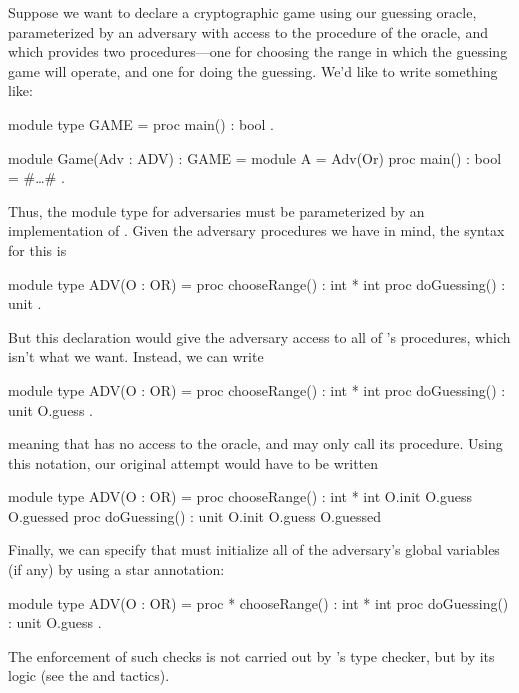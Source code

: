 Suppose we want to declare a cryptographic game using our guessing
oracle, parameterized by an adversary with access to the 
procedure of the oracle, and which provides two procedures---one
for choosing the range in which the guessing game will operate, and
one for doing the guessing.  We'd like to write something like:
\begin{easycrypt}{}{}
module type GAME = {
  proc main() : bool
}.

module Game(Adv : ADV) : GAME = {
  module A = Adv(Or)
  proc main() : bool = { #\ldots# }
}.
\end{easycrypt}
Thus, the module type  for adversaries must be parameterized
by an implementation of . Given the adversary procedures we have
in mind, the syntax for this is
\begin{easycrypt}{}{}
module type ADV(O : OR) = {
  proc chooseRange() : int * int
  proc doGuessing() : unit
}.
\end{easycrypt}
But this declaration would give the adversary access to all of 's
procedures, which isn't what we want. Instead, we can write
\begin{easycrypt}{}{}
module type ADV(O : OR) = {
  proc chooseRange() : int * int {}
  proc doGuessing() : unit {O.guess}
}.
\end{easycrypt}
meaning that  has no access to the oracle, and
 may only call its  procedure. Using
this notation, our original attempt would have to be written
\begin{easycrypt}{}{}
module type ADV(O : OR) = {
  proc chooseRange() : int * int {O.init O.guess O.guessed}
  proc doGuessing() : unit {O.init O.guess O.guessed}
}
\end{easycrypt}

Finally, we can specify that  must initialize
all of the adversary's global variables (if any) by using a
star annotation:
\begin{easycrypt}{}{}
module type ADV(O : OR) = {
  proc * chooseRange() : int * int {}
  proc doGuessing() : unit {O.guess}
}.
\end{easycrypt}
The enforcement of such checks is not carried out by \EasyCrypt's type
checker, but by its logic (see the  and 
tactics).

